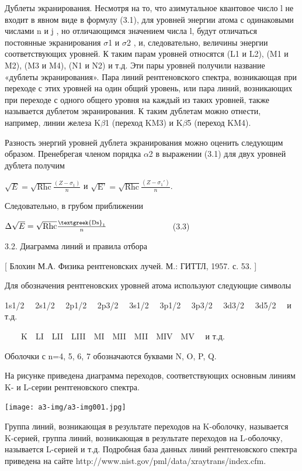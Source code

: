 \documentclass[a4paper,14pt, openany, twoside, draft]{extbook} %
\begin{document}
Дублеты экранирования. Несмотря на то, что азимутальное квантовое число l не входит в явном виде в формулу (3.1), для уровней энергии атома с одинаковыми числами n и j , но отличающимся значением числа l,  будут отличаться постоянные экранирования ${\sigma}$1  и ${\sigma}$2 , и, следовательно, величины энергии соответствующих уровней. К таким парам уровней относятся (L1 и L2), (M1 и M2), (M3 и M4), (N1 и N2) и т.д. Эти пары уровней получили название «дублеты экранирования». Пара линий рентгеновского спектра, возникающая при переходе с этих уровней на один общий уровень, или пара линий, возникающих при переходе с одного общего уровня на каждый из таких уровней, также называется дублетом экранирования. К таким дублетам можно отнести, например, линии железа K${\beta}$1 (переход KM3) и K${\beta}$5 (переход KM4).

Разность энергий уровней дублета экранирования можно оценить следующим образом. Пренебрегая членом порядка ${\alpha}$2 в выражении (3.1) для двух уровней дублета получим

 $\sqrt E=\sqrt{{\text{Rhc}}}\frac{(Z-\sigma _1)} n$ и $\sqrt{{\text{E'}}}=\sqrt{{\text{Rhc}}}\frac{(Z-\sigma _1')} n$.

Следовательно, в грубом приближении

 $\Delta \sqrt E=\sqrt{{\text{Rhc}}}\frac{{\text{\textgreek{Ds}}}_1} n$\ \ \ \ \ \ \ \ \ \ \ \ \ \ \ \ (3.3)

3.2. Диаграмма линий и правила отбора

[ Блохин М.А. Физика рентгеновских лучей. М.: ГИТТЛ, 1957. с. 53. ]

Для обозначения рентгеновских уровней атома используют следующие символы

1s1/2  \ \ 2s1/2  \ \ 2p1/2  \ \ 2p3/2  \ \ 3s1/2  \ \ 3p1/2  \ \ 3p3/2  \ \ 3d3/2  \ \ 3d5/2  \ \ и т.д.

\ \ \ \ K\ \ LI\ \ LII\ \ LIII\ \ MI\ \ MII\ \ MII\ \ MIV\ \ MV \ \ и т.д.

Оболочки с n=4, 5, 6, 7 обозначаются буквами N, O, P, Q.

На рисунке приведена диаграмма переходов, соответствующих основным линиям K{}- и L{}-серии рентгеновского спектра.

 \texttt{[image: a3-img/a3-img001.jpg]}

Группа линий, возникающая в результате переходов на K-оболочку, называется K-серией, группа линий, возникающая в результате переходов на L-оболочку, называется L-серией и т.д. Подробная база данных линий рентгеновского спектра приведена на сайте http://www.nist.gov/pml/data/xraytrans/index.cfm.
\end{document}
